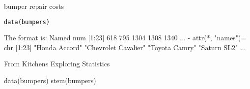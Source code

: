 \begin{Description}\relax
bumper repair costs
\end{Description}
\begin{Usage}
\begin{verbatim}data(bumpers)\end{verbatim}
\end{Usage}
\begin{Format}\relax
The format is:
Named num [1:23]  618  795 1304 1308 1340 ...
- attr(*, "names")= chr [1:23] "Honda Accord" "Chevrolet Cavalier" "Toyota Camry" "Saturn SL2" ...
\end{Format}
\begin{Source}\relax
From Kitchens Exploring Statistics
\end{Source}
\begin{Examples}
\begin{ExampleCode}
data(bumpers)
stem(bumpers)
\end{ExampleCode}
\end{Examples}

